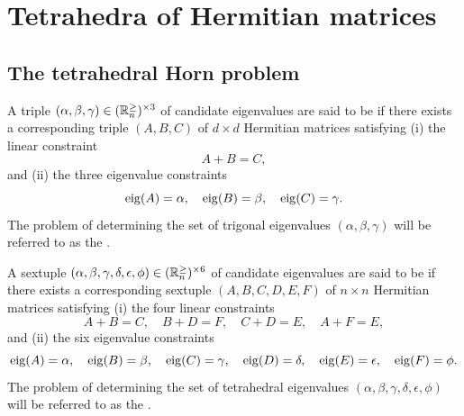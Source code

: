 \documentclass[notitlepage, 10pt]{article}
\begin{document}
\clearpage
\section{Tetrahedra of Hermitian matrices}

\subsection{The tetrahedral Horn problem}

\begin{prob}
    \label{prob:tri_problem}
    A triple $(\alpha,\beta,\gamma) \in (\mathbb R^{\geq}_{n})^{\times 3}$ of candidate eigenvalues are said to be  if there exists a corresponding triple $(A,B,C)$ of $d\times d$ Hermitian matrices satisfying (i) the linear constraint
    \begin{equation}
        \label{eq:tri_linear_constraints}
        A + B = C,
    \end{equation}
    and (ii) the three eigenvalue constraints
    \begin{equation}
        \label{eq:tri_eigenvalue_constraints}
        \operatorname{eig}(A) = \alpha, \quad
        \operatorname{eig}(B) = \beta, \quad
        \operatorname{eig}(C) = \gamma.
    \end{equation}
    The problem of determining the set of trigonal eigenvalues $(\alpha,\beta,\gamma)$ will be referred to as the .
\end{prob}

\begin{prob}
    \label{prob:tet_problem}
    A sextuple $(\alpha,\beta,\gamma,\delta,\epsilon,\phi) \in (\mathbb R^{\geq}_{n})^{\times 6}$ of candidate eigenvalues are said to be  if there exists a corresponding sextuple $(A,B,C,D,E,F)$ of $n\times n$ Hermitian matrices satisfying (i) the four linear constraints
    \begin{equation}
        \label{eq:tet_linear_constraints}
        A + B = C, \quad
        B + D = F, \quad
        C + D = E, \quad
        A + F = E,
    \end{equation}
    and (ii) the six eigenvalue constraints
    \begin{equation}
        \label{eq:tet_eigenvalue_constraints}
        \operatorname{eig}(A) = \alpha, \quad
        \operatorname{eig}(B) = \beta, \quad
        \operatorname{eig}(C) = \gamma, \quad
        \operatorname{eig}(D) = \delta, \quad
        \operatorname{eig}(E) = \epsilon, \quad
        \operatorname{eig}(F) = \phi.
    \end{equation}
    The problem of determining the set of tetrahedral eigenvalues $(\alpha,\beta,\gamma,\delta,\epsilon,\phi)$ will be referred to as the .
\end{prob}
\end{document}
